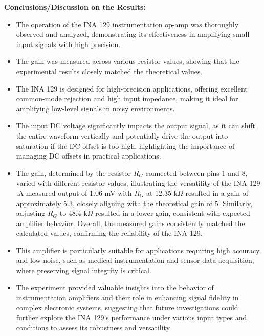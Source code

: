 \documentclass[11pt]{scrreprt}
\begin{document}
\noindent\textbf{Conclusions/Discussion on the Results:}
\begin{itemize}

\item The operation of the INA 129 instrumentation op-amp was thoroughly observed and analyzed, demonstrating its effectiveness in amplifying small input signals with high precision. 

\item The gain was measured across various resistor values, showing that the experimental results closely matched the theoretical values. 

\item The INA 129 is designed for high-precision applications, offering excellent common-mode rejection and high input impedance, making it ideal for amplifying low-level signals in noisy environments.

\item The input DC voltage significantly impacts the output signal, as it can shift the entire waveform vertically and potentially drive the output into saturation if the DC offset is too high, highlighting the importance of managing DC offsets in practical applications. 
 

\item The gain, determined by the resistor $R_G$ connected between pins 1 and 8, varied with different resistor values, illustrating the versatility of the INA 129 .A measured output of 1.06 mV with $R_G$ at 12.35 k$\Omega$ resulted in a gain of approximately 5.3, closely aligning with the theoretical gain of 5. Similarly, adjusting $R_G$ to 48.4 k$\Omega$ resulted in a lower gain, consistent with expected amplifier behavior. Overall, the measured gains consistently matched the calculated values, confirming the reliability of the INA 129. 

\item This amplifier is particularly suitable for applications requiring high accuracy and low noise, such as medical instrumentation and sensor data acquisition, where preserving signal integrity is critical. 

\item The experiment provided valuable insights into the behavior of instrumentation amplifiers and their role in enhancing signal fidelity in complex electronic systems, suggesting that future investigations could further explore the INA 129's performance under various input types and conditions to assess its robustness and versatility

\end{itemize}
\end{document}
